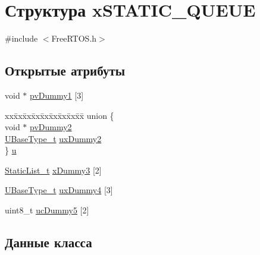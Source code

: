 \hypertarget{structx_s_t_a_t_i_c___q_u_e_u_e}{}\section{Структура x\+S\+T\+A\+T\+I\+C\+\_\+\+Q\+U\+E\+UE}
\label{structx_s_t_a_t_i_c___q_u_e_u_e}


{\ttfamily \#include $<$Free\+R\+T\+O\+S.\+h$>$}

\subsection*{Открытые атрибуты}
\begin{DoxyCompactItemize}
\item 
void $\ast$ \mbox{\hyperlink{structx_s_t_a_t_i_c___q_u_e_u_e_aacf22a66a8d723648995692ec77ee416}{pv\+Dummy1}} \mbox{[}3\mbox{]}
\item 
\begin{tabbing}
xx\=xx\=xx\=xx\=xx\=xx\=xx\=xx\=xx\=\kill
union \{\\
\>void $\ast$ \mbox{\hyperlink{structx_s_t_a_t_i_c___q_u_e_u_e_adb72a02b22a558f6fad381d65af5ac68}{pvDummy2}}\\
\>\mbox{\hyperlink{portmacro_8h_a646f89d4298e4f5afd522202b11cb2e6}{UBaseType\_t}} \mbox{\hyperlink{structx_s_t_a_t_i_c___q_u_e_u_e_ab4e6a2a0bb59ba54d05927e99afd553f}{uxDummy2}}\\
\} \mbox{\hyperlink{structx_s_t_a_t_i_c___q_u_e_u_e_a2b4e38f31bc4a42f71b3bc9062089d13}{u}}\\

\end{tabbing}\item 
\mbox{\hyperlink{_free_r_t_o_s_8h_a9735ad9101a2bd25f83a62089a4acee6}{Static\+List\+\_\+t}} \mbox{\hyperlink{structx_s_t_a_t_i_c___q_u_e_u_e_add0de93e08b632124122850bcd543597}{x\+Dummy3}} \mbox{[}2\mbox{]}
\item 
\mbox{\hyperlink{portmacro_8h_a646f89d4298e4f5afd522202b11cb2e6}{U\+Base\+Type\+\_\+t}} \mbox{\hyperlink{structx_s_t_a_t_i_c___q_u_e_u_e_a502854697731754ce445f6503d14b127}{ux\+Dummy4}} \mbox{[}3\mbox{]}
\item 
uint8\+\_\+t \mbox{\hyperlink{structx_s_t_a_t_i_c___q_u_e_u_e_a541c5044376603540cc3c9cabcbdc5e6}{uc\+Dummy5}} \mbox{[}2\mbox{]}
\end{DoxyCompactItemize}


\subsection{Данные класса}
\mbox{\label{structx_s_t_a_t_i_c___q_u_e_u_e_aacf22a66a8d723648995692ec77ee416}} 
